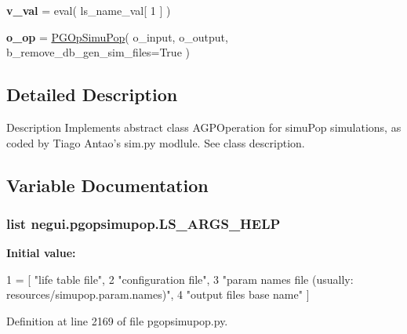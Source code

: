 \begin{DoxyCompactItemize}
\item 
{\bfseries v\+\_\+val} = eval( ls\+\_\+name\+\_\+val\mbox{[} 1 \mbox{]} )\hypertarget{namespacenegui_1_1pgopsimupop_aeffd6c5f556c328191067fd39181557e}{}\label{namespacenegui_1_1pgopsimupop_aeffd6c5f556c328191067fd39181557e}

\item 
{\bfseries o\+\_\+op} = \hyperlink{classnegui_1_1pgopsimupop_1_1PGOpSimuPop}{P\+G\+Op\+Simu\+Pop}( o\+\_\+input, o\+\_\+output, b\+\_\+remove\+\_\+db\+\_\+gen\+\_\+sim\+\_\+files=True )\hypertarget{namespacenegui_1_1pgopsimupop_a5a81830b86fd00feca327e6861c2abe8}{}\label{namespacenegui_1_1pgopsimupop_a5a81830b86fd00feca327e6861c2abe8}

\end{DoxyCompactItemize}


\subsection{Detailed Description}
\begin{DoxyVerb}Description
Implements abstract class AGPOperation for simuPop simulations,
as coded by Tiago Antao's sim.py modlule.  See class description.
\end{DoxyVerb}
 

\subsection{Variable Documentation}
\subsubsection[{\texorpdfstring{L\+S\+\_\+\+A\+R\+G\+S\+\_\+\+H\+E\+LP}{LS_ARGS_HELP}}]{\setlength{\rightskip}{0pt plus 5cm}list negui.\+pgopsimupop.\+L\+S\+\_\+\+A\+R\+G\+S\+\_\+\+H\+E\+LP}\hypertarget{namespacenegui_1_1pgopsimupop_ab1daad40ea6c75e53102a403b937d5f3}{}\label{namespacenegui_1_1pgopsimupop_ab1daad40ea6c75e53102a403b937d5f3}
{\bfseries Initial value\+:}
\begin{DoxyCode}
1 = [ \textcolor{stringliteral}{"life table file"},
2                         \textcolor{stringliteral}{"configuration file"},
3                         \textcolor{stringliteral}{"param names file (usually: resources/simupop.param.names)"},
4                         \textcolor{stringliteral}{"output files base name"} ]
\end{DoxyCode}


Definition at line 2169 of file pgopsimupop.\+py.

